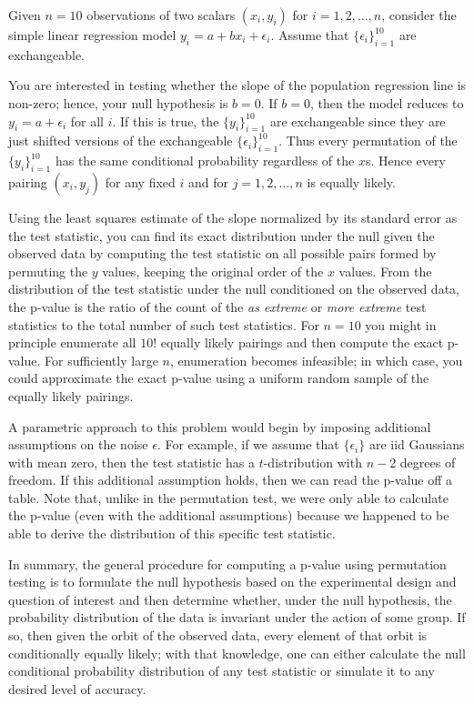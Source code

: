 \begin{example} Given $n=10$ observations of two scalars $(x_i, y_i)$ for
$i = 1, 2, \dots, n$, consider the simple linear regression model
$y_i = a + bx_i + \epsilon_i$.  Assume that $\{\epsilon_i\}_{i=1}^{10}$ are
exchangeable.

You are interested in testing whether the slope of the population regression line
is non-zero; hence, your null hypothesis is $b = 0$. If $b = 0$, then the model
reduces to $y_i = a + \epsilon_i$ for all $i$.  If this is true, the
$\{y_i\}_{i=1}^{10}$ are exchangeable since they are just shifted versions of the
exchangeable $\{\epsilon_i\}_{i=1}^{10}$.  Thus every permutation of the $\{y_i\}_{i=1}^{10}$ has the same
conditional probability regardless of the $x$s.  Hence every pairing
$(x_i, y_j)$ for any fixed $i$ and for $j = 1, 2, \dots, n$ is equally likely.

Using the least squares estimate of the slope normalized by its standard error
as the test statistic, you can find its exact distribution under the null given
the observed data by computing the test statistic on all possible pairs
formed by permuting the $y$ values, keeping the original order of the $x$ values.  From the distribution
of the test statistic under the null conditioned on the observed data, the
p-value is the ratio of the count of the \emph{as extreme} or \emph{more
extreme} test statistics to the total number of such test statistics. For
$n=10$ you might in principle enumerate all $10!$ equally likely pairings and then compute
the exact p-value.  For sufficiently large $n$, enumeration becomes infeasible;
in which case, you could approximate the exact p-value using a uniform random
sample of the equally likely pairings.

A parametric approach to this problem would begin by imposing additional
assumptions on the noise $\epsilon$.  For example, if we assume
that $\{\epsilon_i\}$ are iid Gaussians with mean zero, 
then the test statistic has a
$t$-distribution with $n-2$ degrees of freedom.  If this additional assumption
holds, then we can read the p-value off a table.  Note that, unlike in the
permutation test, we were only able to calculate the p-value (even with the
additional assumptions) because we happened to be able to derive the
distribution of this specific test statistic.
\end{example}

In summary, the general procedure for computing a p-value using permutation
testing is to formulate the null hypothesis based on the
experimental design and question of interest and then determine whether,
under the null hypothesis, the probability distribution of the data is invariant
under the action of some group. 
If so, then given the orbit of the observed data, every element of that
orbit is conditionally equally likely; with that knowledge,
one can either calculate the null conditional probability distribution
of any test statistic or simulate it to any desired level of accuracy. 

